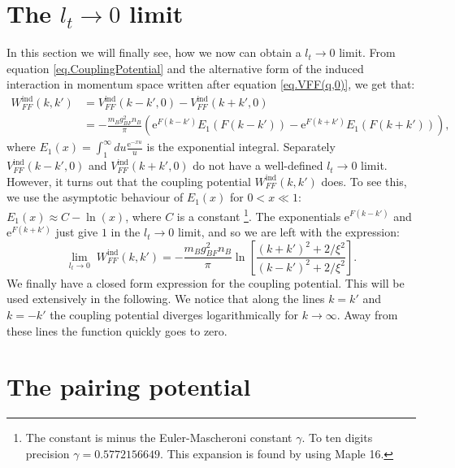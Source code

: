 \section{The $l_t \to 0$ limit}
In this section we will finally see, how we now can obtain a $l_t\to 0$ limit. From equation \eqref{eq.CouplingPotential} and the alternative form of the induced interaction in momentum space written after equation \eqref{eq.VFF(q,0)}, we get that:
\begin{align}
W^\text{ind}_{FF}(k,k') &= V^\text{ind}_{FF}(k-k',0) - V^\text{ind}_{FF}(k+k',0) \nonumber \\
&= -\frac{m_Bg_{BF}^2n_B}{\pi}\left( \text{e}^{F(k-k')} E_1(F(k-k')) - \text{e}^{F(k+k')} E_1(F(k+k')) \right), \nonumber
\end{align}
where $E_1(x) = \int_1^\infty du \frac{\text{e}^{-xu}}{u}$ is the exponential integral. Separately $V^\text{ind}_{FF}(k-k',0)$ and $V^\text{ind}_{FF}(k+k',0)$ do not have a well-defined $l_t \to 0$ limit. However, it turns out that the coupling potential $W^\text{ind}_{FF}(k,k')$ does. To see this, we use the asymptotic behaviour of $E_1(x)$ for $0 < x \ll 1$: $E_1(x) \approx C -\ln(x)$, where $C$ is a constant \footnote{The constant is minus the Euler-Mascheroni constant $\gamma$. To ten digits precision $\gamma = 0.5772156649$. This expansion is found by using Maple 16.}. The exponentials $\text{e}^{F(k-k')}$ and $\text{e}^{F(k+k')}$ just give $1$ in the $l_t \to 0$ limit, and so we are left with the expression:
\begin{equation}
\lim_{l_t \to 0} \; W^\text{ind}_{FF}(k,k') = -\frac{m_Bg_{BF}^2n_B}{\pi} \ln\left[\frac{(k+k')^2+2/\xi^2}{(k-k')^2+2/\xi^2}\right].
\label{eq.CouplingPotentiallt=0} 
\end{equation}
We finally have a closed form expression for the coupling potential. This will be used extensively in the following. We notice that along the lines $k = k'$ and $k = -k'$ the coupling potential diverges logarithmically for $k\to \infty$. Away from these lines the function quickly goes to zero.  

\section{The pairing potential} \label{sec.pairingpotential}
